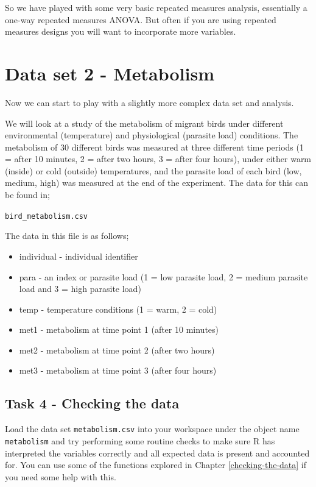 \documentclass[
]{book}
\providecommand{\tightlist}{%
  \setlength{\itemsep}{0pt}\setlength{\parskip}{0pt}}
\begin{document}
So we have played with some very basic repeated measures analysis, essentially a one-way repeated measures ANOVA. But often if you are using repeated measures designs you will want to incorporate more variables.

\hypertarget{data-set-2---metabolism}{%
\section{Data set 2 - Metabolism}\label{data-set-2---metabolism}}

Now we can start to play with a slightly more complex data set and analysis.

We will look at a study of the metabolism of migrant birds under different environmental (temperature) and physiological (parasite load) conditions. The metabolism of 30 different birds was measured at three different time periods (1 = after 10 minutes, 2 = after two hours, 3 = after four hours), under either warm (inside) or cold (outside) temperatures, and the parasite load of each bird (low, medium, high) was measured at the end of the experiment. The data for this can be found in;

\texttt{bird\_metabolism.csv}

The data in this file is as follows;

\begin{itemize}
\tightlist
\item
  individual - individual identifier
\item
  para - an index or parasite load (1 = low parasite load, 2 = medium parasite load and 3 = high parasite load)
\item
  temp - temperature conditions (1 = warm, 2 = cold)
\item
  met1 - metabolism at time point 1 (after 10 minutes)
\item
  met2 - metabolism at time point 2 (after two hours)
\item
  met3 - metabolism at time point 3 (after four hours)
\end{itemize}

\hypertarget{task-4---checking-the-data}{%
\subsection{Task 4 - Checking the data}\label{task-4---checking-the-data}}

Load the data set \texttt{metabolism.csv} into your workspace under the object name \texttt{metabolism} and try performing some routine checks to make sure R has interpreted the variables correctly and all expected data is present and accounted for. You can use some of the functions explored in Chapter \ref{checking-the-data} if you need some help with this.
\end{document}
